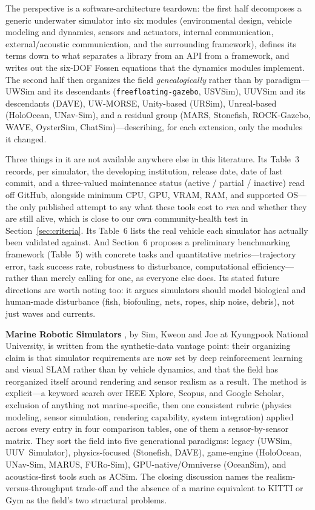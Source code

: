 \documentclass[11pt]{article}
\begin{document}
The perspective is a software-architecture teardown: the first half decomposes a generic underwater simulator into six modules (environmental design, vehicle modeling and dynamics, sensors and actuators, internal communication, external/acoustic communication, and the surrounding framework), defines its terms down to what separates a library from an API from a framework, and writes out the six-DOF Fossen equations that the dynamics modules implement. The second half then organizes the field \emph{genealogically} rather than by paradigm---UWSim and its descendants (\texttt{freefloating-gazebo}, USVSim), UUVSim and its descendants (DAVE), UW-MORSE, Unity-based (URSim), Unreal-based (HoloOcean, UNav-Sim), and a residual group (MARS, Stonefish, ROCK-Gazebo, WAVE, OysterSim, ChatSim)---describing, for each extension, only the modules it changed.

Three things in it are not available anywhere else in this literature. Its Table~3 records, per simulator, the developing institution, release date, date of last commit, and a three-valued maintenance status (active / partial / inactive) read off GitHub, alongside minimum CPU, GPU, VRAM, RAM, and supported OS---the only published attempt to say what these tools cost to \emph{run} and whether they are still alive, which is close to our own community-health test in Section~\ref{sec:criteria}. Its Table~6 lists the real vehicle each simulator has actually been validated against. And Section~6 proposes a preliminary benchmarking framework (Table~5) with concrete tasks and quantitative metrics---trajectory error, task success rate, robustness to disturbance, computational efficiency---rather than merely calling for one, as everyone else does. Its stated future directions are worth noting too: it argues simulators should model biological and human-made disturbance (fish, biofouling, nets, ropes, ship noise, debris), not just waves and currents.

\textbf{Marine Robotic Simulators} \autocite{sim2026marinesim}, by Sim, Kweon and Joe at Kyungpook National University, is written from the synthetic-data vantage point: their organizing claim is that simulator requirements are now set by deep reinforcement learning and visual SLAM rather than by vehicle dynamics, and that the field has reorganized itself around rendering and sensor realism as a result. The method is explicit---a keyword search over IEEE Xplore, Scopus, and Google Scholar, exclusion of anything not marine-specific, then one consistent rubric (physics modeling, sensor simulation, rendering capability, system integration) applied across every entry in four comparison tables, one of them a sensor-by-sensor matrix. They sort the field into five generational paradigms: legacy (UWSim, UUV~Simulator), physics-focused (Stonefish, DAVE), game-engine (HoloOcean, UNav-Sim, MARUS, FURo-Sim), GPU-native/Omniverse (OceanSim), and acoustics-first tools such as ACSim. The closing discussion names the realism-versus-throughput trade-off and the absence of a marine equivalent to KITTI or Gym as the field's two structural problems.
\end{document}
